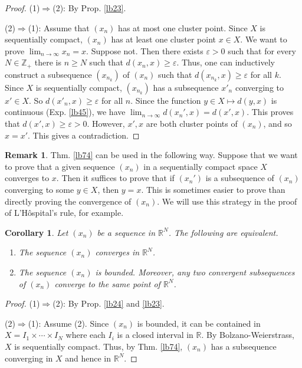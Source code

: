 \documentclass[12pt,b5paper,notitlepage]{article}
\theoremstyle{definition}
\newtheorem{rem}[df]{Remark}
\theoremstyle{plain}
\newtheorem{co}[df]{Corollary}
\newcommand{\Zbb}{\mathbb Z}
\newcommand{\Rbb}{\mathbb R}
\newcommand{\eps}{\varepsilon}
\numberwithin{equation}{section}
\begin{document}
\begin{proof}
(1)$\Rightarrow$(2): By Prop. \ref{lb23}.

(2)$\Rightarrow$(1): Assume that $(x_n)$ has at most one cluster point. Since $X$ is sequentially compact, $(x_n)$ has at least one cluster point $x\in X$. We want to prove $\lim_{n\rightarrow\infty} x_n=x$. Suppose not. Then there exists $\eps>0$ such that for every $N\in\Zbb_+$ there is $n\geq N$ such that $d(x_n,x)\geq \eps$. Thus, one can inductively construct a subsequence $(x_{n_k})$ of $(x_n)$ such that $d(x_{n_k},x)\geq\eps$ for all $k$. Since $X$ is sequentially compact, $(x_{n_k})$ has a subsequence $x'_n$ converging to $x'\in X$. So $d(x'_n,x)\geq\eps$ for all $n$. Since the function $y\in X\mapsto d(y,x)$ is continuous (Exp. \ref{lb45}), we have $\lim_{n\rightarrow\infty}d(x_n',x)=d(x',x)$. This proves that $d(x',x)\geq\eps>0$. However, $x',x$ are both cluster points of $(x_n)$, and so $x=x'$. This gives a contradiction. 
\end{proof}

\begin{rem}
Thm. \ref{lb74} can be used in the following way. Suppose that we want to prove that a given sequence $(x_n)$ in a sequentially compact space $X$ converges to $x$. Then it suffices to prove that if $(x_n')$ is a subsequence of $(x_n)$ converging to some $y\in X$, then $y=x$. This is sometimes easier to prove than directly proving the convergence of $(x_n)$. We will use this strategy in the proof of L'H\^ospital's rule, for example.
\end{rem}





\begin{co}\label{lb75}
Let $(x_n)$ be a sequence in $\Rbb^N$. The following are equivalent.
\begin{enumerate}[label=(\arabic*)]
\item The sequence $(x_n)$ converges in $\Rbb^N$.
\item The sequence $(x_n)$ is bounded. Moreover, any two convergent subsequences of $(x_n)$ converge to the same point of $\Rbb^N$.
\end{enumerate}
\end{co}

\begin{proof}
(1)$\Rightarrow$(2): By Prop. \ref{lb24} and \ref{lb23}. 

(2)$\Rightarrow$(1): Assume (2). Since $(x_n)$ is bounded, it can be contained in $X=I_1\times\cdots\times I_N$ where each $I_i$ is a closed interval in $\Rbb$. By Bolzano-Weierstrass, $X$ is sequentially compact. Thus, by Thm. \ref{lb74}, $(x_n)$ has a subsequence converging in $X$ and hence in $\Rbb^N$.
\end{proof}
\end{document}
